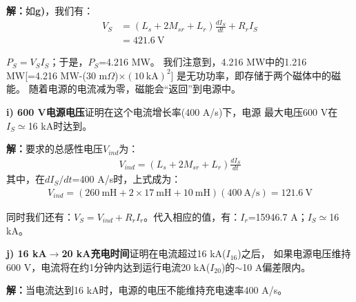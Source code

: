 \textbf{解：}如\textbf{g)}，我们有：
\begin{align*}%
V_S&=(L_s+2M_{sr}+L_r)\frac{dI_S}{dt}+R_rI_S\\ \tag{g.1}
&=421.6\ \mathrm{V}
\end{align*}

$P_S=V_S I_S$；于是，$P_S$=4.216 MW。
我们注意到，4.216 MW中的1.216 MW[=4.216 MW-(30 m$\Omega$)$\times(10\ \mathrm{kA})^2$]
是无功功率，即存储于两个磁体中的磁能。
随着电源的电流减为零，磁能会“返回”到电源中。

\textbf{i) 600 V电源电压}\qquad 证明在这个电流增长率(400 A/s)下，电源
最大电压600 V在$I_S\simeq$16 kA时达到。

\textbf{解：}要求的总感性电压$V_{ind}$为：
\begin{align*}%
V_{ind}=(L_s+2M_{sr}+L_r)\frac{dI_S}{dt}
\end{align*}
其中，在$dI_S/dt$=400 A/s时，上式成为：
\begin{align*}%
V_{ind}=(260\ \mathrm{mH}+2\times17\ \mathrm{mH}+10\ \mathrm{mH})(400\ \mathrm{A/s})=121.6\ \mathrm{V}
\end{align*}

同时我们还有：$V_S=V_{ind}+R_rI_r$。代入相应的值，有：$I_r$=15946.7 A；$I_S\simeq$16 kA。

\textbf{j) 16 kA$\rightarrow$20 kA充电时间}\qquad 证明在电流超过16 kA($I_{16}$)之后，
如果电源电压维持600 V，电流将在约1分钟内达到运行电流20 kA($I_{20}$)的$\sim$10 A偏差限内。

\textbf{解：}当电流达到16 kA时，电源的电压不能维持充电速率400 A/s。


